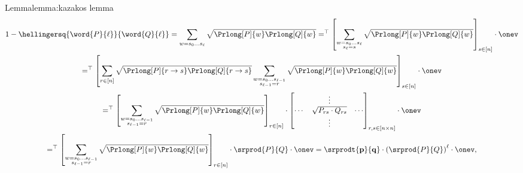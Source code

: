 \begin{prevproof}{Lemma}{lemma:kazakos lemma}
	\begin{multline*}
	1-\hellingersq{\word{P}{\ell}}{\word{Q}{\ell}}=\sum_{w=s_0\ldots s_\ell}\sqrt{\Prlong[P]{w}\Prlong[Q]{w}}
	=\trans{\left[\sum_{\substack{w=s_0\ldots s_{\ell}\\s_\ell=s}}\sqrt{\Prlong[P]{w}\Prlong[Q]{w}}\right]}_{s\in[n]}\circ\onev\\
	=\trans{\left[\sum_{r\in[n]}\sqrt{\Prlong[P]{r\to s}\Prlong[Q]{r\to s}}\sum_{\substack{w=s_0\ldots s_{\ell-1}\\s_{\ell-1}=r}}\sqrt{\Prlong[P]{w}\Prlong[Q]{w}}\right]}_{s\in[n]}\circ\onev\\
	=\trans{\left[\sum_{\substack{w=s_0\ldots s_{\ell-1}\\s_{\ell-1}=r}}\sqrt{\Prlong[P]{w}\Prlong[Q]{w}}\right]}_{r\in[n]}\circ
	\begin{bmatrix}
	&\vdots&\\
	\cdots&\sqrt{P_{rs}\cdot Q_{rs}}&\cdots\\
	&\vdots&
	\end{bmatrix}_{r,s\in[n\times n]}
	\circ\onev
	\\
	=\trans{\left[\sum_{\substack{w=s_0\ldots s_{\ell-1}\\s_{\ell-1}=r}}\sqrt{\Prlong[P]{w}\Prlong[Q]{w}}\right]}_{r\in[n]}\circ\srprod{P}{Q}\circ\onev
	=\srprodt{\vect{p}}{\vect{q}}\circ \left(\srprod{P}{Q}\right)^{\ell} \circ \onev,
	\end{multline*}
\end{prevproof}


